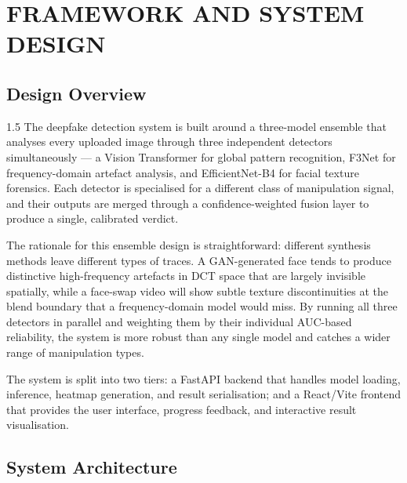 \chapter{FRAMEWORK AND SYSTEM DESIGN}

\section{Design Overview}

\begin{spacing}{1.5}
The deepfake detection system is built around a three-model ensemble that analyses every uploaded image through three independent detectors simultaneously --- a Vision Transformer for global pattern recognition, F3Net for frequency-domain artefact analysis, and EfficientNet-B4 for facial texture forensics. Each detector is specialised for a different class of manipulation signal, and their outputs are merged through a confidence-weighted fusion layer to produce a single, calibrated verdict.

The rationale for this ensemble design is straightforward: different synthesis methods leave different types of traces. A GAN-generated face tends to produce distinctive high-frequency artefacts in DCT space that are largely invisible spatially, while a face-swap video will show subtle texture discontinuities at the blend boundary that a frequency-domain model would miss. By running all three detectors in parallel and weighting them by their individual AUC-based reliability, the system is more robust than any single model and catches a wider range of manipulation types.

The system is split into two tiers: a FastAPI backend that handles model loading, inference, heatmap generation, and result serialisation; and a React/Vite frontend that provides the user interface, progress feedback, and interactive result visualisation.
\end{spacing}

\section{System Architecture}

